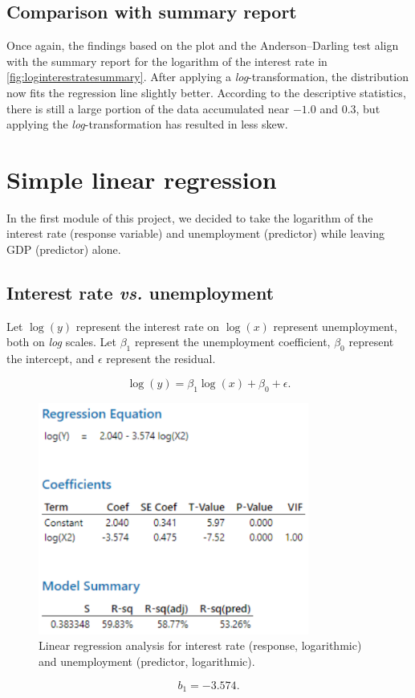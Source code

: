 \documentclass[12pt]{article}
\begin{document}
\subsection{Comparison with summary report}
Once again, the findings based on the plot and the Anderson--Darling test align with the summary report for the logarithm of the interest rate in \autoref{fig:loginterestratesummary}. After applying a \textit{log}-transformation, the distribution now fits the regression line slightly better. According to the descriptive statistics, there is still a large portion of the data accumulated near $-1.0$ and 0.3, but applying the \textit{log}-transformation has resulted in less skew.
\section{Simple linear regression}
In the first module of this project, we decided to take the logarithm of the interest rate (response variable) and unemployment (predictor) while leaving GDP (predictor) alone.
\subsection{Interest rate \textit{vs.} unemployment}
Let $\log(y)$ represent the interest rate on $\log(x)$ represent unemployment, both on \textit{log} scales. Let $\beta_1$ represent the unemployment coefficient, $\beta_0$ represent the intercept, and $\epsilon$ represent the residual.

\[\log(y)=\beta_1\log(x)+\beta_0+\epsilon.\]
\begin{figure}[h]
\begin{center}
\includegraphics[width=3.5in]{images/log-log-unemployment-regression.png}
\end{center}
\caption{Linear regression analysis for interest rate (response, logarithmic) and unemployment (predictor, logarithmic). \label{fig:loglogunemploymentregression}}
\end{figure}
\[b_1=-3.574.\]
\end{document}
